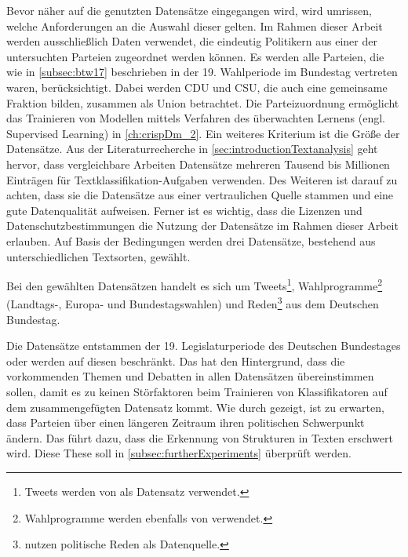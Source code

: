 Bevor näher auf die genutzten Datensätze eingegangen wird, wird umrissen, welche Anforderungen an die Auswahl dieser gelten. Im Rahmen dieser Arbeit werden ausschließlich Daten verwendet, die eindeutig Politikern aus einer der untersuchten Parteien zugeordnet werden können. Es werden alle Parteien, die wie in \autoref{subsec:btw17} beschrieben in der \num{19}. Wahlperiode im Bundestag vertreten waren, berücksichtigt. Dabei werden \ac{CDU} und \ac{CSU}, die auch eine gemeinsame Fraktion bilden, zusammen als Union betrachtet. Die Parteizuordnung ermöglicht das Trainieren von Modellen mittels Verfahren des überwachten Lernens (engl. Supervised Learning) in \autoref{ch:crispDm_2}. Ein weiteres Kriterium ist die Größe der Datensätze. Aus der Literaturrecherche in \autoref{sec:introductionTextanalysis} geht hervor, dass vergleichbare Arbeiten Datensätze mehreren Tausend bis Millionen Einträgen für Textklassifikation-Aufgaben verwenden. Des Weiteren ist darauf zu achten, dass sie die Datensätze aus einer vertraulichen Quelle stammen und eine gute Datenqualität aufweisen. Ferner ist es wichtig, dass die Lizenzen und Datenschutzbestimmungen die Nutzung der Datensätze im Rahmen dieser Arbeit erlauben. Auf Basis der Bedingungen werden drei Datensätze, bestehend aus unterschiedlichen Textsorten, gewählt. 

Bei den  gewählten Datensätzen handelt es sich um Tweets\footnote{Tweets werden von \textcite{saltzer_bundestagswahl_2022, saltzer_finding_2022, guhr_training_2020, wong_quantifying_2016} als Datensatz verwendet.}, Wahlprogramme\footnote{Wahlprogramme werden ebenfalls von \textcite{biessmann_predicting_2016} verwendet.} (Landtags-, Europa- und Bundestagswahlen) und Reden\footnote{\textcite{doan_using_2022, biessmann_predicting_2016, simoes_fine-tuned_2020} nutzen politische Reden als Datenquelle.} aus dem Deutschen Bundestag.

Die Datensätze entstammen der 19. Legislaturperiode des Deutschen Bundestages oder werden auf diesen beschränkt. Das hat den Hintergrund, dass die vorkommenden Themen und Debatten in allen Datensätzen übereinstimmen sollen, damit es zu keinen Störfaktoren beim Trainieren von Klassifikatoren auf dem zusammengefügten Datensatz kommt. Wie durch \textcite{richter_open_2021} gezeigt, ist zu erwarten, dass Parteien über einen längeren Zeitraum ihren politischen Schwerpunkt ändern. Das führt dazu, dass die Erkennung von Strukturen in Texten erschwert wird. Diese These soll in \autoref{subsec:furtherExperiments} überprüft werden.

